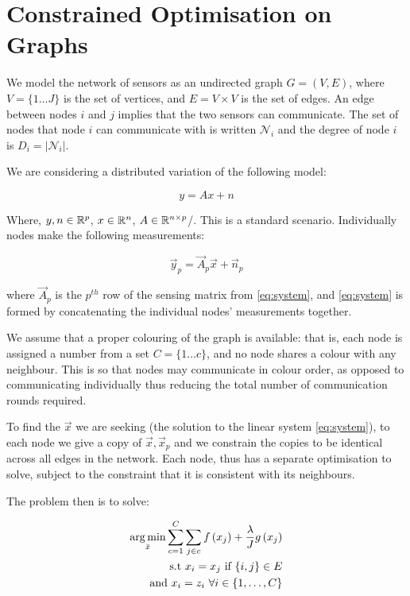 \section{Constrained Optimisation on Graphs}\label{sec:opt-on-graphs}

We model the network of sensors as an undirected graph \(G = \left(V,E\right)\), where \(V = \{1 \ldots J\}\) is the set of vertices, and \(E = V \times V\) is the set of edges. An edge between nodes \(i\) and \(j\) implies that the two sensors can communicate. The set of nodes that node \(i\) can communicate with is written \(\mathcal{N}_i\) and the degree of node \(i\) is \(D_i = |\mathcal{N}_i|\). 

We are considering a distributed variation of the following model:

\begin{equation}
y = A x + n
\end{equation}
\label{eq:system}

Where, \(y, n\in {\mathbb{R}}^{p}\), \(x \in {\mathbb{R}}^n\), \(A\in {\mathbb{R}}^{n \times p}\)/. This is a standard scenario. Individually nodes make the following measurements:

\begin{equation}
\vec{y}_p = \vec{A}_p\vec{x} + \vec{n}_p
\end{equation}

where \(\vec{A}_p\) is the \(p^{th} \) row of the sensing matrix from \eqref{eq:system}, and \eqref{eq:system} is formed by concatenating the individual nodes' measurements together.

We assume that a proper colouring of the graph is available: that is, each node is assigned a number from a set \(C = \{1 \ldots c \} \), and no node shares a colour with any neighbour. This is so that nodes may communicate in colour order, as opposed to communicating individually thus reducing the total number of communication rounds required. 

To find the \(\vec{x}\) we are seeking (the solution to the linear system \eqref{eq:system}), to each node we give a copy of \(\vec{x}, \vec{x}_p\) and we constrain the copies to be identical across all edges in the network. Each node, thus has a separate optimisation to solve, subject to the constraint that it is consistent with its neighbours.

The problem then is to solve:

\begin{align}
\operatorname*{arg\,min}_{\bar{x}} \sum_{c=1}^C \sum_{j \in c} f\left(x_j\right) + \frac{\lambda}{J} g\left(x_j\right) \nonumber \\ 
\text{ s.t } x_i = x_j \text{ if } \{i,j\} \in E \nonumber \\
\text{ and } x_i = z_i \text{ } \forall i \in \{1, \ldots, C\}
\label{constrainedbp}
\end{align}

